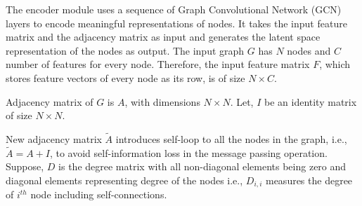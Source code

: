 \label{para:enc}
The encoder module uses a sequence of Graph Convolutional Network (GCN) \cite{4700287} layers to encode meaningful representations of nodes. It takes the input feature matrix and the adjacency matrix as input and generates the latent space representation of the nodes as output. The input graph $G$ has $N$ nodes and $C$ number of features for every node. Therefore, the input feature matrix $F$, which stores feature vectors of every node as its row, is of size $N \times C$.
\begin{comment}
\begin{gather}
F = \begin{bmatrix}
F_{0,0} & F_{0,1} & F_{0,2} & \dots & F_{0,C-1}\\
F_{1,0} & F_{1,1} & F_{1,2} & \dots & F_{1,C-1}\\
\vdots&\ddots&&&\vdots\\
F_{N-1,0} & F_{N-1,1} & F_{N-1,2} & \dots & F_{N-1,C-1}
\end{bmatrix}
\end{gather}
\end{comment}
Adjacency matrix of $G$ is $A$, with dimensions $N \times N$. Let, $I$ be an identity matrix of size $N \times N$. 
\begin{comment}
\begin{equation}
\widetilde{A} = A + I
\end{equation}
\end{comment}

 New adjacency matrix $\widetilde{A}$ introduces self-loop to all the nodes in the graph, i.e., $\widetilde{A} = A + I$, to avoid self-information loss in the message passing operation.
Suppose, $D$ is the degree matrix with all non-diagonal elements being zero and diagonal elements representing degree of the nodes i.e., $D_{i,i}$ measures the degree of $i^{th}$ node including self-connections.
\begin{comment}
\begin{equation}
\begin{split}
\widehat{A} & = D^{-\frac{1}{2}}\times \widetilde{A} \times D^{-\frac{1}{2}}\\
& = \begin{bmatrix}
\frac{1}{\sqrt{D_{0,0}}} & 0 & 0 & \dots & 0\\
0 & \frac{1}{\sqrt{D_{1,1}}} & 0 & \dots & 0\\
\vdots && \ddots && \vdots\\
0 & 0 & 0 & \dots & \frac{1}{\sqrt{D_{N-1,N-1}}}
\end{bmatrix} \times 
\begin{bmatrix}
1 & A_{0,1} & A_{0,2} & \dots & A_{0,N-1}\\
A_{1,0} & 1 & A_{1,2} & \dots & A_{1,N-1}\\
\vdots && \ddots && \vdots \\
A_{N-1,0} & A_{N-1,1} & A_{N-1,2} & \dots & 1
\end{bmatrix} \times
D^{-\frac{1}{2}}
\end{split}
\end{equation}
\end{comment}

